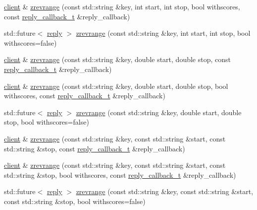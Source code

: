 \begin{DoxyCompactItemize}
\hyperlink{classcpp__redis_1_1client}{client} \& \hyperlink{classcpp__redis_1_1client_a37bfbe4848350144e7899c6d1e63653b}{zrevrange} (const std\+::string \&key, int start, int stop, bool withscores, const \hyperlink{classcpp__redis_1_1client_a061a1140d36d2eaeda82b09a0bb3f9f2}{reply\+\_\+callback\+\_\+t} \&reply\+\_\+callback)
\item 
std\+::future$<$ \hyperlink{classcpp__redis_1_1reply}{reply} $>$ \hyperlink{classcpp__redis_1_1client_a001bdf0f597d386202b0aab116657055}{zrevrange} (const std\+::string \&key, int start, int stop, bool withscores=false)
\item 
\hyperlink{classcpp__redis_1_1client}{client} \& \hyperlink{classcpp__redis_1_1client_a7b20d0dc47cf4fb40220e51408876d6d}{zrevrange} (const std\+::string \&key, double start, double stop, const \hyperlink{classcpp__redis_1_1client_a061a1140d36d2eaeda82b09a0bb3f9f2}{reply\+\_\+callback\+\_\+t} \&reply\+\_\+callback)
\item 
\hyperlink{classcpp__redis_1_1client}{client} \& \hyperlink{classcpp__redis_1_1client_ac03871ced545f10c9f277fd5fc20f0a0}{zrevrange} (const std\+::string \&key, double start, double stop, bool withscores, const \hyperlink{classcpp__redis_1_1client_a061a1140d36d2eaeda82b09a0bb3f9f2}{reply\+\_\+callback\+\_\+t} \&reply\+\_\+callback)
\item 
std\+::future$<$ \hyperlink{classcpp__redis_1_1reply}{reply} $>$ \hyperlink{classcpp__redis_1_1client_a85aa18b29763edd1d93c4b463b6b3a51}{zrevrange} (const std\+::string \&key, double start, double stop, bool withscores=false)
\item 
\hyperlink{classcpp__redis_1_1client}{client} \& \hyperlink{classcpp__redis_1_1client_ab72a94b6f16cb23cf39275bfc9e35385}{zrevrange} (const std\+::string \&key, const std\+::string \&start, const std\+::string \&stop, const \hyperlink{classcpp__redis_1_1client_a061a1140d36d2eaeda82b09a0bb3f9f2}{reply\+\_\+callback\+\_\+t} \&reply\+\_\+callback)
\item 
\hyperlink{classcpp__redis_1_1client}{client} \& \hyperlink{classcpp__redis_1_1client_ae4cef5e8cba4196287bf89375889a2e4}{zrevrange} (const std\+::string \&key, const std\+::string \&start, const std\+::string \&stop, bool withscores, const \hyperlink{classcpp__redis_1_1client_a061a1140d36d2eaeda82b09a0bb3f9f2}{reply\+\_\+callback\+\_\+t} \&reply\+\_\+callback)
\item 
std\+::future$<$ \hyperlink{classcpp__redis_1_1reply}{reply} $>$ \hyperlink{classcpp__redis_1_1client_a973fb4632a18f70bec092f3c9659045e}{zrevrange} (const std\+::string \&key, const std\+::string \&start, const std\+::string \&stop, bool withscores=false)

\end{DoxyCompactItemize}
